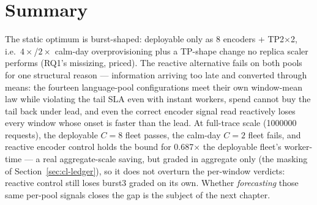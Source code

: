 \section{Summary}
\label{sec:base-summary}

The static optimum is burst-shaped: deployable only as 8 encoders +
TP2$\times$2, i.e.\ $4\times$/$2\times$ calm-day overprovisioning plus a
TP-shape change no replica scaler performs (RQ1's missizing, priced).
The reactive alternative fails on both pools for one structural reason
--- information arriving too late and converted through means: the
fourteen language-pool configurations meet their own window-mean law
while violating the tail SLA even with instant workers,
spend cannot buy the tail back under lead,
and even the correct encoder signal read reactively loses every window
whose onset is faster than the lead. At full-trace scale
(\num{1000000} requests), the deployable $C{=}8$ fleet passes, the
calm-day $C{=}2$ fleet fails, and reactive encoder control holds the
bound for 0.687$\times$ the deployable fleet's worker-time --- a real
aggregate-scale saving, but graded in aggregate only (the masking of
Section~\ref{sec:cl-ledger}), so it does not overturn the per-window
verdicts: reactive control still loses burst3 graded on its own. Whether
\emph{forecasting} those same per-pool signals closes
the gap is the subject of the next chapter.
